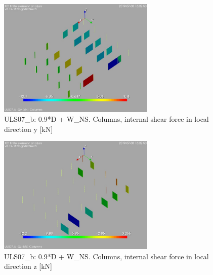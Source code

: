 \begin{figure}
\begin{center}
\includegraphics[width=75mm]{annex_res_columns/graphics/resSimplLC/ULS07_bcolumnsQy}
\caption{ULS07\_b: 0.9*D + W\_NS. Columns, internal shear force in local direction y [kN]}
\end{center}
\end{figure}
\begin{figure}
\begin{center}
\includegraphics[width=75mm]{annex_res_columns/graphics/resSimplLC/ULS07_bcolumnsQz}
\caption{ULS07\_b: 0.9*D + W\_NS. Columns, internal shear force in local direction z [kN]}
\end{center}
\end{figure}

